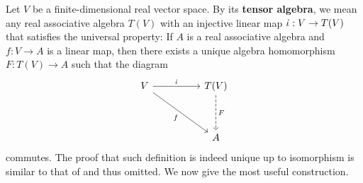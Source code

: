 \documentclass{report}
\begin{document}
\begin{mdframed}
Let $V$ be a finite-dimensional real vector space. By its  \textbf{tensor algebra}, we mean any real associative algebra $T(V)$ with an injective linear map $\dot{\iota}:V\rightarrow T(V)$ that satisfies the universal property: If $A$ is a real associative algebra and $f:V\rightarrow A$ is a linear map, then there exists a unique algebra homomorphism $F:T(V)\rightarrow A$ such that the diagram  
\[\begin{tikzcd}
	V && {T(V)} \\
	\\
	&& A
	\arrow["{\dot{\iota}}", from=1-1, to=1-3]
	\arrow["f"', from=1-1, to=3-3]
	\arrow["F", dashed, from=1-3, to=3-3]
\end{tikzcd}\]
commutes. The proof that such definition is indeed unique up to isomorphism is similar to that of  and thus omitted. We now give the most useful construction. \\


\end{mdframed}
\end{document}
